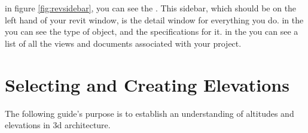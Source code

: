 \documentclass{tufte-book} %
\begin{document}
 in figure \ref{fig:revsidebar}, you can see the . This sidebar, which should be on the left hand of your revit window, is the detail window for everything you do. in the  you can see the type of object, and the specifications for it. in the  you can see a list of all the views and documents associated with your project.
 

\section{Selecting and Creating Elevations}
The following guide's purpose is to establish an understanding of altitudes and elevations in 3d architecture.
\end{document}
